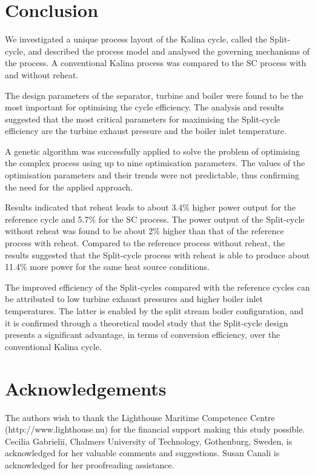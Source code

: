 \documentclass[review,3p]{elsarticle}
\begin{document}
\section{Conclusion}
We investigated a unique process layout of the Kalina cycle, called the Split-cycle, and described the process model and analysed the governing mechanisms of the process. A conventional Kalina process was compared to the SC process with and without reheat. 

The design parameters of the separator, turbine and boiler were found to be the most important for optimising the cycle efficiency. The analysis and results suggested that the most critical parameters for maximising the Split-cycle efficiency are the turbine exhaust pressure and the boiler inlet temperature.


A genetic algorithm was successfully applied to solve the problem of optimising the complex process using up to nine optimisation parameters. The values of the optimisation parameters and their trends were not predictable, thus confirming the need for the applied approach.

Results indicated that reheat leads to about 3.4\% higher power output for the reference cycle and 5.7\% for the SC process. The power output of the Split-cycle without reheat was found to be about 2\% higher than that of the reference process with reheat. Compared to the reference process without reheat, the results suggested that the Split-cycle process with reheat is able to produce about 11.4\% more power for the same heat source conditions.

The improved efficiency of the Split-cycles compared with the reference cycles can be attributed to low turbine exhaust pressures and higher boiler inlet temperatures. The latter is enabled by the split stream boiler configuration, and it is confirmed through a theoretical model study that the Split-cycle design presents a significant advantage, in terms of conversion efficiency, over the conventional Kalina cycle.




\section*{Acknowledgements}
The authors wish to thank the Lighthouse Maritime Competence Centre (http://www.lighthouse.nu) for the financial support making this study possible. Cecilia Gabrielii, Chalmers University of Technology, Gothenburg, Sweden, is acknowledged for her valuable comments and suggestions. Susan Canali is acknowledged for her proofreading assistance.
\end{document}
